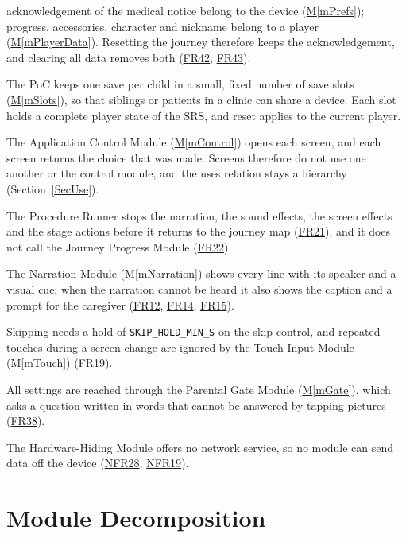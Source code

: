 \documentclass[12pt, titlepage]{article}
\newcommand{\mref}[1]{\hyperref[#1]{M\ref*{#1}}}
\newcommand{\srsurl}{https://team-hindsight.github.io/ophthamology-game/SRS/SRS.pdf}
\newcommand{\srsfrref}[2]{\href{\srsurl\#nameddest=#1}{FR#2}}
\newcommand{\srsnfrref}[2]{\href{\srsurl\#nameddest=#1}{NFR#2}}
\begin{document}
\begin{description}
  acknowledgement of the medical notice belong to the device (\mref{mPrefs});
  progress, accessories, character and nickname belong to a player
  (\mref{mPlayerData}). Resetting the journey therefore keeps the
  acknowledgement, and clearing all data removes both
  (\srsfrref{FR_ResetJourney}{42}, \srsfrref{FR_ClearAllData}{43}).
\item[Several players per device.] The PoC keeps one save per child in a
  small, fixed number of save slots (\mref{mSlots}), so that siblings or
  patients in a clinic can share a device. Each slot holds a complete player
  state of the SRS, and reset applies to the current player.
\item[Control at the top.] The Application Control Module (\mref{mControl})
  opens each screen, and each screen returns the choice that was made. Screens
  therefore do not use one another or the control module, and the uses
  relation stays a hierarchy (Section~\ref{SecUse}).
\item[Leaving a level stops everything.] The Procedure Runner stops the
  narration, the sound effects, the screen effects and the stage actions before
  it returns to the journey map (\srsfrref{FR_StopOnExit}{21}), and it does not
  call the Journey Progress Module (\srsfrref{FR_ExitKeepsData}{22}).
\item[Instructions are never only audio.] The Narration Module
  (\mref{mNarration}) shows every line with its speaker and a visual cue; when
  the narration cannot be heard it also shows the caption and a prompt for the
  caregiver (\srsfrref{FR_SpokenInstructions}{12},
  \srsfrref{FR_VisualCues}{14}, \srsfrref{FR_NarrationFallback}{15}).
\item[Deliberate skip.] Skipping needs a hold of
  \texttt{SKIP\_HOLD\_MIN\_S} on the skip control, and repeated touches during
  a screen change are ignored by the Touch Input Module (\mref{mTouch})
  (\srsfrref{FR_IgnoreRepeatedTouches}{19}).
\item[Parental gate.] All settings are reached through the Parental Gate
  Module (\mref{mGate}), which asks a question written in words that cannot be
  answered by tapping pictures (\srsfrref{FR_ParentGate}{38}).
\item[No network.] The Hardware-Hiding Module offers no network service, so no
  module can send data off the device (\srsnfrref{NFR_Privacy}{28},
  \srsnfrref{NFR_Offline}{19}).
\end{description}

\section{Module Decomposition} \label{SecMD}
\end{document}
